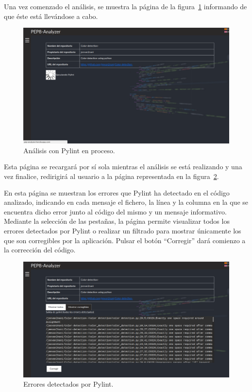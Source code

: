 \documentclass[a4paper, 12pt]{book}
\begin{document}
Una vez comenzado el análisis, se muestra la página de la figura~\ref{fig:paso3} informando de que éste está llevándose a cabo.
\begin{figure}[h]
  \centering
  \includegraphics[width=13cm, keepaspectratio]{img/paso3.png}
  \caption{Análisis con Pylint en proceso.}\label{fig:paso3}
\end{figure}
\newpage

Esta página se recargará por sí sola mientras el análisis se está realizando y una vez finalice, redirigirá al usuario a la página representada en la figura~\ref{fig:paso4}.

En esta página se muestran los errores que Pylint ha detectado en el código analizado, indicando en cada mensaje el fichero, la línea y la columna en la que se encuentra dicho error junto al código del mismo y un mensaje informativo.
Mediante la selección de las pestañas, la página permite visualizar todos los errores detectados por Pylint o realizar un filtrado para mostrar únicamente los que son corregibles por la aplicación.
Pulsar el botón ``Corregir'' dará comienzo a la corrección del código.

\begin{figure}[h]
  \centering
  \includegraphics[width=13cm, keepaspectratio]{img/paso4.png}
  \caption{Errores detectados por Pylint.}\label{fig:paso4}
\end{figure}
\end{document}
